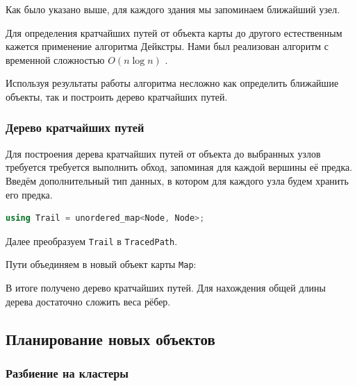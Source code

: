 \documentclass[11pt]{article}
\begin{document}
    Как было указано выше, для каждого здания мы запоминаем ближайший узел.
    
    
    
    Для определения кратчайших путей от объекта карты до другого естественным кажется применение алгоритма Дейкстры.
    Нами был реализован алгоритм с временной сложностью $ O(n \log n) $ \cite{clrs}.
    
    
    
    Используя результаты работы алгоритма несложно как определить ближайшие объекты, так и построить дерево кратчайших путей.
    
	\subsubsection{Дерево кратчайших путей}\label{subsubsection:shortest_paths_tree}    
    
    Для построения дерева кратчайших путей от объекта до выбранных узлов требуется требуется выполнить обход, запоминая для каждой вершины её предка.
    Введём дополнительный тип данных, в котором для каждого узла будем хранить его предка.
    
    \begin{lstlisting}[language=C++]
using Trail = unordered_map<Node, Node>;    
    \end{lstlisting}
    
	

	Далее преобразуем \texttt{Trail} в \texttt{TracedPath}.
	
	

	Пути объединяем в новый объект карты \texttt{Map}:

	

	В итоге получено дерево кратчайших путей.
	Для нахождения общей длины дерева достаточно сложить веса рёбер.
    
	\subsection{Планирование новых объектов}
	
	\subsubsection{Разбиение на кластеры}
\end{document}
